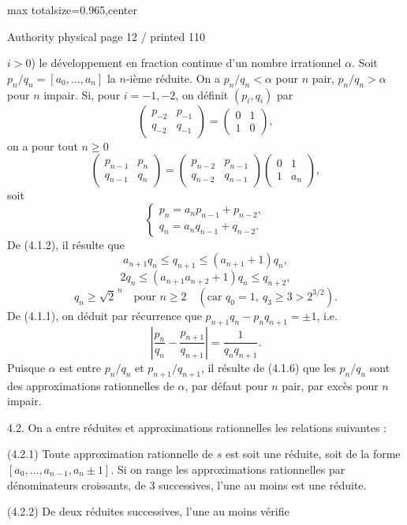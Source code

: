 \documentclass{article}
\begin{document}
\newpage
\noindent\begin{adjustbox}{max totalsize={\textwidth}{0.965\textheight},center}\begin{minipage}{\textwidth}
\noindent\hfill\scriptsize Authority physical page 12 / printed 110\par\normalsize
\(i>0\)) le développement en fraction continue d’un nombre irrationnel \(\alpha\). Soit \(p_n/q_n=[a_0,\ldots,a_n]\) la \(n\)-ième réduite. On a \(p_n/q_n<\alpha\) pour \(n\) pair, \(p_n/q_n>\alpha\) pour \(n\) impair. Si, pour \(i=-1,-2\), on définit \((p_i,q_i)\) par
\[
\begin{pmatrix}p_{-2}&p_{-1}\\q_{-2}&q_{-1}\end{pmatrix}
=\begin{pmatrix}0&1\\1&0\end{pmatrix},
\]
on a pour tout \(n\geq0\)
\[
\tag{4.1.1}
\begin{pmatrix}p_{n-1}&p_n\\q_{n-1}&q_n\end{pmatrix}
=\begin{pmatrix}p_{n-2}&p_{n-1}\\q_{n-2}&q_{n-1}\end{pmatrix}
\begin{pmatrix}0&1\\1&a_n\end{pmatrix},
\]
soit
\[
\tag{4.1.2}
\begin{cases}
p_n=a_np_{n-1}+p_{n-2},\\
q_n=a_nq_{n-1}+q_{n-2}.
\end{cases}
\]
De (4.1.2), il résulte que
\[
\tag{4.1.3}a_{n+1}q_n\leq q_{n+1}\leq(a_{n+1}+1)q_n,
\]
\[
\tag{4.1.4}2q_n\leq(a_{n+1}a_{n+2}+1)q_n\leq q_{n+2},
\]
\[
\tag{4.1.5}q_n\geq\sqrt{2}^{\,n}\quad\text{pour }n\geq2\quad(\text{car }q_0=1,\ q_3\geq3>2^{3/2}).
\]
De (4.1.1), on déduit par récurrence que \(p_{n+1}q_n-p_nq_{n+1}=\pm1\), i.e.
\[
\tag{4.1.6}
\left|\frac{p_n}{q_n}-\frac{p_{n+1}}{q_{n+1}}\right|=\frac1{q_nq_{n+1}}.
\]
Puisque \(\alpha\) est entre \(p_n/q_n\) et \(p_{n+1}/q_{n+1}\), il résulte de (4.1.6) que les \(p_n/q_n\) sont des approximations rationnelles de \(\alpha\), par défaut pour \(n\) pair, par excès pour \(n\) impair.

4.2. On a entre réduites et approximations rationnelles les relations suivantes :

(4.2.1) Toute approximation rationnelle de \(s\) est soit une réduite, soit de la forme \([a_0,\ldots,a_{n-1},a_n\pm1]\). Si on range les approximations rationnelles par dénominateurs croissants, de \(3\) successives, l’une au moins est une réduite.

(4.2.2) De deux réduites successives, l’une au moins vérifie
\end{minipage}\end{adjustbox}
\end{document}

